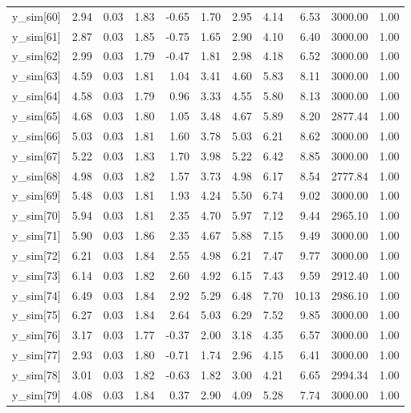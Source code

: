 \begin{table}[ht]
\begin{tabular}{rrrrrrrrrrr}
  y\_sim[60] & 2.94 & 0.03 & 1.83 & -0.65 & 1.70 & 2.95 & 4.14 & 6.53 & 3000.00 & 1.00 \\ 
  y\_sim[61] & 2.87 & 0.03 & 1.85 & -0.75 & 1.65 & 2.90 & 4.10 & 6.40 & 3000.00 & 1.00 \\ 
  y\_sim[62] & 2.99 & 0.03 & 1.79 & -0.47 & 1.81 & 2.98 & 4.18 & 6.52 & 3000.00 & 1.00 \\ 
  y\_sim[63] & 4.59 & 0.03 & 1.81 & 1.04 & 3.41 & 4.60 & 5.83 & 8.11 & 3000.00 & 1.00 \\ 
  y\_sim[64] & 4.58 & 0.03 & 1.79 & 0.96 & 3.33 & 4.55 & 5.80 & 8.13 & 3000.00 & 1.00 \\ 
  y\_sim[65] & 4.68 & 0.03 & 1.80 & 1.05 & 3.48 & 4.67 & 5.89 & 8.20 & 2877.44 & 1.00 \\ 
  y\_sim[66] & 5.03 & 0.03 & 1.81 & 1.60 & 3.78 & 5.03 & 6.21 & 8.62 & 3000.00 & 1.00 \\ 
  y\_sim[67] & 5.22 & 0.03 & 1.83 & 1.70 & 3.98 & 5.22 & 6.42 & 8.85 & 3000.00 & 1.00 \\ 
  y\_sim[68] & 4.98 & 0.03 & 1.82 & 1.57 & 3.73 & 4.98 & 6.17 & 8.54 & 2777.84 & 1.00 \\ 
  y\_sim[69] & 5.48 & 0.03 & 1.81 & 1.93 & 4.24 & 5.50 & 6.74 & 9.02 & 3000.00 & 1.00 \\ 
  y\_sim[70] & 5.94 & 0.03 & 1.81 & 2.35 & 4.70 & 5.97 & 7.12 & 9.44 & 2965.10 & 1.00 \\ 
  y\_sim[71] & 5.90 & 0.03 & 1.86 & 2.35 & 4.67 & 5.88 & 7.15 & 9.49 & 3000.00 & 1.00 \\ 
  y\_sim[72] & 6.21 & 0.03 & 1.84 & 2.55 & 4.98 & 6.21 & 7.47 & 9.77 & 3000.00 & 1.00 \\ 
  y\_sim[73] & 6.14 & 0.03 & 1.82 & 2.60 & 4.92 & 6.15 & 7.43 & 9.59 & 2912.40 & 1.00 \\ 
  y\_sim[74] & 6.49 & 0.03 & 1.84 & 2.92 & 5.29 & 6.48 & 7.70 & 10.13 & 2986.10 & 1.00 \\ 
  y\_sim[75] & 6.27 & 0.03 & 1.84 & 2.64 & 5.03 & 6.29 & 7.52 & 9.85 & 3000.00 & 1.00 \\ 
  y\_sim[76] & 3.17 & 0.03 & 1.77 & -0.37 & 2.00 & 3.18 & 4.35 & 6.57 & 3000.00 & 1.00 \\ 
  y\_sim[77] & 2.93 & 0.03 & 1.80 & -0.71 & 1.74 & 2.96 & 4.15 & 6.41 & 3000.00 & 1.00 \\ 
  y\_sim[78] & 3.01 & 0.03 & 1.82 & -0.63 & 1.82 & 3.00 & 4.21 & 6.65 & 2994.34 & 1.00 \\ 
  y\_sim[79] & 4.08 & 0.03 & 1.84 & 0.37 & 2.90 & 4.09 & 5.28 & 7.74 & 3000.00 & 1.00 \\ 

\end{tabular}
\end{table}
